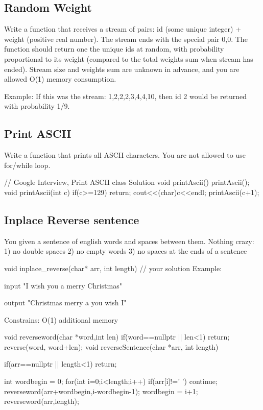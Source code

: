 \subsection{Random Weight}
Write a function that receives a stream of pairs: id (some unique integer) + weight (positive real number). 
The stream ends with the special pair {0,0}. 
The function should return one the unique ids at random, with probability proportional to its weight (compared to the total weights sum when stream has ended). 
Stream size and weights sum are unknown in advance, and you are allowed O(1) memory consumption. 

Example: If this was the stream: {1,2},{2,2},{3,4},{4,10}, then id 2 would be returned with probability 1/9.

\subsection{Print ASCII}
Write a function that prints all ASCII characters. You are not allowed to use for/while loop.
\begin{Code}
	// Google Interview, Print ASCII
	class Solution {
		void printAscii(){
			printAscii();
		}
		void printAscii(int c) {
			if(c>=129)
				return;
			cout<<(char)c<<endl;
			printAscii(c+1);
		}
	}
\end{Code}

\subsection{Inplace Reverse sentence}
You given a sentence of english words and spaces between them. 
Nothing crazy: 
1) no double spaces 
2) no empty words 
3) no spaces at the ends of a sentence


void inplace_reverse(char* arr, int length) {
	// your solution
}
Example: 

input "I wish you a merry Christmas" 

output "Christmas merry a you wish I" 

Constrains: O(1) additional memory

\begin{Code}
	void reverseword(char *word,int len){
		if(word==nullptr || len<1) return;
		reverse(word, word+len);
	}
	void reverseSentence(char *arr, int length){
		if(arr==nullptr || length<1) return;
		
		int wordbegin = 0;
		for(int i=0;i<length;i++){
			if(arr[i]!=' ') continue;
			reverseword(arr+wordbegin,i-wordbegin-1);
			wordbegin = i+1;
		}
		reverseword(arr,length);
	}
\end{Code}

